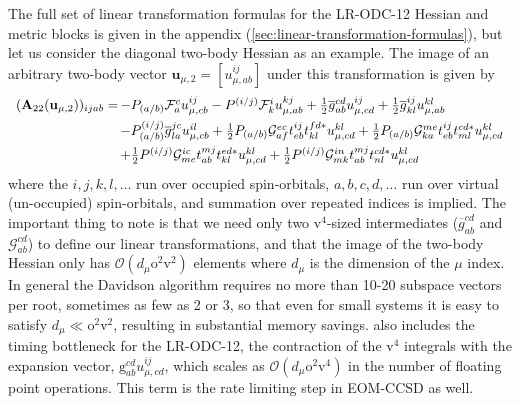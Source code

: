 The full set of linear transformation formulas for the LR-ODC-12 Hessian and
metric blocks is given in the appendix
(\cref{sec:linear-transformation-formulas}), but let us consider the diagonal
two-body Hessian as an example.
The image of an arbitrary two-body vector
\(
    \mathbf{u}_{\mu,2}
    =
    [u_{\mu,ab}^{ij}]
\)
under this transformation is given by
\begin{equation}
    \label{eq:two-body-hessian-function-in-text}
    \begin{array}{r@{\,}l}
        (\mathbf{A}_{22}(\mathbf{u}_{\mu,2}))_{ijab}
        =
        &
        -
        P_{(a/b)}
        \mathcal{F}_a^c
        u_{\mu,cb}^{ij}
        -
        P^{(i/j)}
        \mathcal{F}_k^i
        u_{\mu,ab}^{kj}
        +
        \tfrac{1}{2}
        \overline{g}_{ab}^{cd}
        u_{\mu,cd}^{ij}
        +
        \tfrac{1}{2}
        \overline{g}_{kl}^{ij}
        u_{\mu,ab}^{kl}
        \\[5pt]
        &
        -
        P_{(a/b)}^{(i/j)}
        \overline{g}_{la}^{jc}
        u_{\mu,cb}^{il}
        +
        \tfrac{1}{2}
        P_{(a/b)}
        \mathcal{G}_{af}^{ec}
        t_{eb}^{ij}
        t_{kl}^{fd*}
        u_{\mu,cd}^{kl}
        +
        \tfrac{1}{2}
        P_{(a/b)}
        \mathcal{G}_{ka}^{me}
        t_{eb}^{ij}
        t_{ml}^{cd*}
        u_{\mu,cd}^{kl}
        \\[5pt]
        &
        +
        \tfrac{1}{2}
        P^{(i/j)}
        \mathcal{G}_{me}^{ic}
        t_{ab}^{mj}
        t_{kl}^{ed*}
        u_{\mu,cd}^{kl}
        +
        \tfrac{1}{2}
        P^{(i/j)}
        \mathcal{G}_{mk}^{in}
        t_{ab}^{mj}
        t_{nl}^{cd*}
        u_{\mu,cd}^{kl}
    \end{array}
\end{equation}
where the \(i,j,k,l,\ldots\) run over occupied spin-orbitals, \(a,b,c,d,\ldots\)
run over virtual (un-occupied) spin-orbitals, and summation over repeated
indices is implied.
The important thing to note is that we need only two \(\mathrm{v}^4\)-sized
intermediates (\(\overline{g}_{ab}^{cd}\) and \(\mathcal{G}_{ab}^{cd}\)) to
define our linear transformations, and that the image of the two-body Hessian
only has \(\mathcal{O}(d_\mu\mathrm{o}^2\mathrm{v}^2)\) elements where \(d_\mu\)
is the dimension of the \(\mu\) index.
In general the Davidson algorithm requires no more than 10-20 subspace vectors
per root, sometimes as few as 2 or 3, so that even for small systems it is easy
to satisfy \( d_\mu \ll \mathrm{o}^2\mathrm{v}^2 \), resulting in substantial
memory savings.
 also includes the timing bottleneck
for the LR-ODC-12, the contraction of the \(\mathrm{v}^4\) integrals with the
expansion vector, \(\mathrm{g}_{ab}^{cd}u_{\mu,cd}^{ij}\), which scales as
\(\mathcal{O}(d_\mu\mathrm{o}^2\mathrm{v}^4)\) in the number of floating point
operations.
This term is the rate limiting step in EOM-CCSD as well.


